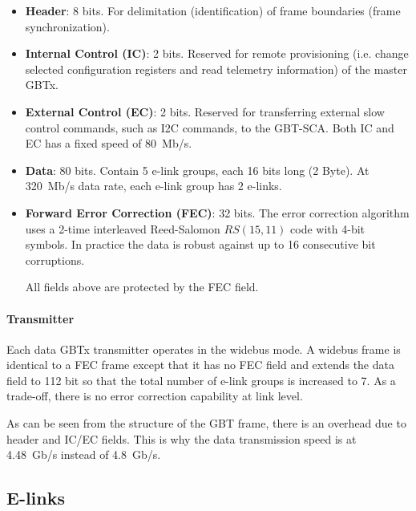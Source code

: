 \begin{itemize}
    \item \textbf{Header}:
        8 bits.
        For delimitation (identification) of frame boundaries
        (frame synchronization).

    \item \textbf{Internal Control (IC)}:
        2 bits.
        Reserved for remote provisioning
        (i.e. change selected configuration registers and read telemetry
        information) of the master GBTx.

    \item \textbf{External Control (EC)}:
        2 bits.
        Reserved for transferring external slow control commands,
        such as I2C commands, to the GBT-SCA.
        Both IC and EC has a fixed speed of 80~Mb/s.

    \item \textbf{Data}:
        80 bits.
        Contain 5 e-link groups, each 16 bits long (2 Byte).
        At 320~Mb/s data rate, each e-link group has 2 e-links.

    \item \textbf{Forward Error Correction (FEC)}:
        32 bits.
        The error correction algorithm uses a 2-time interleaved Reed-Salomon
        $RS(15, 11)$ code with 4-bit symbols.
        In practice the data is robust against up to 16 consecutive bit
        corruptions.

        All fields above are protected by the FEC field.
\end{itemize}

\paragraph{Transmitter}
Each data GBTx transmitter operates in the widebus mode.
A widebus frame is identical to a FEC frame except that it has no FEC field and
extends the data field to 112 bit so that the total number of e-link groups is
increased to 7.
As a trade-off, there is no error correction capability at link level.

As can be seen from the structure of the GBT frame, there is an overhead
due to header and IC/EC fields.
This is why the data transmission speed is at 4.48~Gb/s instead of 4.8~Gb/s.


\subsection{E-links}
\label{dcb-elink}

